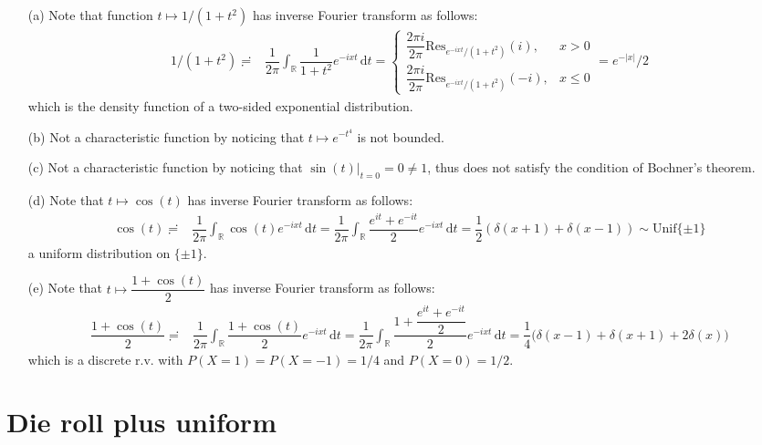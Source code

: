 \documentclass[11pt,a4paper]{article}
\numberwithin{equation}{section}%
\begin{document}
\begin{itemize}[topsep=2pt,itemsep=0pt]
    \item[(a)] Note that function $ t\mapsto 1/(1+t^2) $ has inverse Fourier transform as follows:
    \begin{align*}
        1/(1+t^2)\risingdotseq & \dfrac{ 1 }{ 2\pi } \int _\mathbb{R} \dfrac{ 1 }{ 1+t^2 }e^{-ixt}  \,\mathrm{d}t =\begin{cases}
            \dfrac{ 2\pi i }{ 2\pi } \mathrm{ Res }_{e^{-ixt}/(1+t^2)}(i),& x>0\\
            \dfrac{ 2\pi i }{ 2\pi } \mathrm{ Res }_{e^{-ixt}/(1+t^2)}(-i),& x\leq 0
        \end{cases}= e^{-|x|}/2
    \end{align*}
    which is the density function of a two-sided exponential distribution.
    \item[(b)] Not a characteristic function by noticing that $ t\mapsto e^{-t^4} $ is not bounded.
    \item[(c)] Not a characteristic function by noticing that $ \sin(t)\big|_{t=0}=0\neq 1 $, thus does not satisfy the condition of Bochner's theorem.
    \item[(d)] Note that $ t\mapsto \cos(t) $ has inverse Fourier transform as follows:
    \begin{align*}
        \cos(t)\risingdotseq & \dfrac{ 1 }{ 2\pi } \int _\mathbb{R} \cos(t)e^{-ixt}  \,\mathrm{d}t =\dfrac{ 1 }{ 2\pi } \int _\mathbb{R} \dfrac{ e^{it}+e^{-it} }{ 2 }e^{-ixt}  \,\mathrm{d}t =\dfrac{ 1 }{ 2 }(\delta (x+1)+\delta (x-1))
        \sim \mathrm{ Unif }\{\pm 1\} 
    \end{align*}
    a uniform distribution on $ \{\pm 1\} $.
    \item[(e)] Note that $ t\mapsto \dfrac{ 1+\cos(t) }{ 2 } $ has inverse Fourier transform as follows:
    \begin{align*}
        \dfrac{ 1+\cos(t) }{ 2 }\risingdotseq & \dfrac{ 1 }{ 2\pi } \int _\mathbb{R} \dfrac{ 1+\cos(t) }{ 2 }e^{-ixt}  \,\mathrm{d}t= \dfrac{ 1 }{ 2\pi } \int _\mathbb{R} \dfrac{ 1+\dfrac{ e^{it}+e^{-it} }{ 2 } }{ 2 }e^{-ixt}  \,\mathrm{d}t= \dfrac{ 1 }{ 4 }\big( \delta (x-1)+\delta (x+1) + 2\delta (x) \big)
    \end{align*}
    which is a discrete r.v. with $ P(X=1)=P(X=-1)=1/4 $ and $ P(X=0)=1/2 $.
\end{itemize}

    

\section{Die roll plus uniform}\label{sec:die_roll_plus_uniform}
\end{document}
